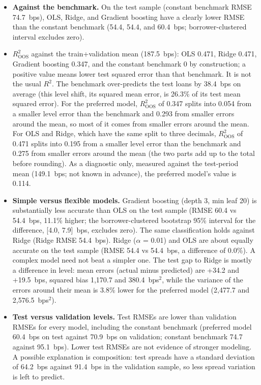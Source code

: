 \documentclass[9pt,letterpaper]{extarticle}
\begin{document}
\begin{itemize}
  \item \textbf{Against the benchmark.} On the test sample (constant benchmark RMSE 74.7~bps), OLS, Ridge, and Gradient boosting have a clearly lower RMSE than the constant benchmark (54.4, 54.4, and 60.4~bps; borrower-clustered interval excludes zero).
  \item $R^2_{\mathrm{OOS}}$ against the train+validation mean (187.5~bps): OLS 0.471, Ridge 0.471, Gradient boosting 0.347, and the constant benchmark 0 by construction; a positive value means lower test squared error than that benchmark. It is not the usual $R^2$. The benchmark over-predicts the test loans by 38.4~bps on average (this level shift, its squared mean error, is 26.3\% of its test mean squared error). For the preferred model, $R^2_{\mathrm{OOS}}$ of 0.347 splits into 0.054 from a smaller level error than the benchmark and 0.293 from smaller errors around the mean, so most of it comes from smaller errors around the mean. For OLS and Ridge, which have the same split to three decimals, $R^2_{\mathrm{OOS}}$ of 0.471 splits into 0.195 from a smaller level error than the benchmark and 0.275 from smaller errors around the mean (the two parts add up to the total before rounding). As a diagnostic only, measured against the test-period mean (149.1~bps; not known in advance), the preferred model's value is 0.114.
  \item \textbf{Simple versus flexible models.} Gradient boosting (depth 3, min leaf 20) is substantially less accurate than OLS on the test sample (RMSE 60.4 vs 54.4~bps, 11.1\% higher; the borrower-clustered bootstrap 95\% interval for the difference, [4.0, 7.9]~bps, excludes zero). The same classification holds against Ridge (Ridge RMSE 54.4~bps). Ridge ($\alpha$ = 0.01) and OLS are about equally accurate on the test sample (RMSE 54.4 vs 54.4~bps, a difference of 0.0\%). A complex model need not beat a simpler one. The test gap to Ridge is mostly a difference in level: mean errors (actual minus predicted) are +34.2 and +19.5~bps, squared bias 1,170.7 and 380.4~bps$^2$, while the variance of the errors around their mean is 3.8\% lower for the preferred model (2,477.7 and 2,576.5~bps$^2$).
  \item \textbf{Test versus validation levels.} Test RMSEs are lower than validation RMSEs for every model, including the constant benchmark (preferred model 60.4~bps on test against 70.9~bps on validation; constant benchmark 74.7 against 95.1~bps). Lower test RMSEs are not evidence of stronger modeling. A possible explanation is composition: test spreads have a standard deviation of 64.2~bps against 91.4~bps in the validation sample, so less spread variation is left to predict.

\end{itemize}
\end{document}
